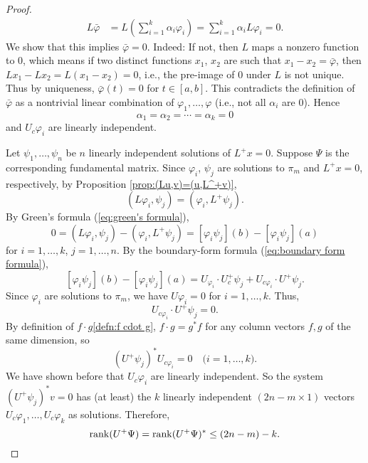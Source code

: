 \documentclass[10.5pt, oneside, a4paper]{article}
\begin{document}
\begin{proof}
{    \begin{align*}
        L\bar{\varphi} &= L\left(\sum_{i=1}^k \alpha_i\varphi_i\right) = \sum_{i=1}^k \alpha_i L\varphi_i = 0.
    \end{align*}
    We show that this implies $\bar{\varphi}=0$. Indeed: If not, then $L$ maps a nonzero function to $0$, which means if two distinct functions $x_1$, $x_2$ are such that $x_1-x_2=\bar{\varphi}$, then $Lx_1-Lx_2=L(x_1-x_2)=0$, i.e., the pre-image of $0$ under $L$ is not unique. 
    }
    Thus by uniqueness, $\bar{\varphi}(t)=0$ for $t\in [a,b]$. This contradicts the definition of $\bar{\varphi}$ as a nontrivial linear combination of $\varphi_1,\ldots,\varphi$ {\color{blue}(i.e., not all $\alpha_i$ are $0$)}. Hence
    \[\alpha_1=\alpha_2=\cdots=\alpha_k=0\]
    and $U_c\varphi_i$ are linearly independent.

    Let $\psi_1,\ldots,\psi_n$ be $n$ linearly independent solutions of $L^+x=0$.  Suppose $\Psi$ is the corresponding fundamental matrix. Since $\varphi_i$, $\psi_j$ are solutions to $\pi_m$ and $L^+x=0$, respectively, {\color{blue}by Proposition \ref{prop:(Lu,v)=(u,L^+v)}},
    \[(L\varphi_i, \psi_j) = (\varphi_i, L^+\psi_j).\]
    By Green's formula (\ref{eq:green's formula}),
    \[0 = (L\varphi_i, \psi_j) - (\varphi_i, L^+\psi_j) = [\varphi_i\psi_j](b) - [\varphi_i\psi_j](a)\]
    for $i=1,\ldots,k$, $j=1,\ldots,n$. By the boundary-form formula (\ref{eq:boundary form formula}),
    \[[\varphi_i\psi_j](b) - [\varphi_i\psi_j](a) = U_{\varphi_i}\cdot U_c^+\psi_j + U_{c\varphi_i}\cdot U^+\psi_j.\]
    {\color{blue}
    Since $\varphi_i$ are solutions to $\pi_m$, we have $U\varphi_i=0$ for $i=1,\ldots,k$.
    }
    Thus,
    \[U_{c\varphi_i}\cdot U^+\psi_j = 0.\]
    By definition of $f\cdot g$\ref{defn:f cdot g}, $f\cdot g=g^*f$ for any column vectors $f, g$ of the same dimension, so
    \[(U^+\psi_j)^*U_{c\varphi_i}=0\quad\mbox{($i=1,\ldots,k$)}.\]
    We have shown before that $U_c\varphi_i$ are linearly independent. So the system $(U^+\psi_j)^*v=0$ has (at least) the $k$ linearly independent $(2n-m\times 1)$ vectors $U_c\varphi_1,\ldots, U_c\varphi_k$ as solutions. Therefore,
    \[\operatorname{rank}(U^+\Psi) = \operatorname{rank}(U^+\Psi)^*\leq (2n-m)-k.\]


\end{proof}
\end{document}
